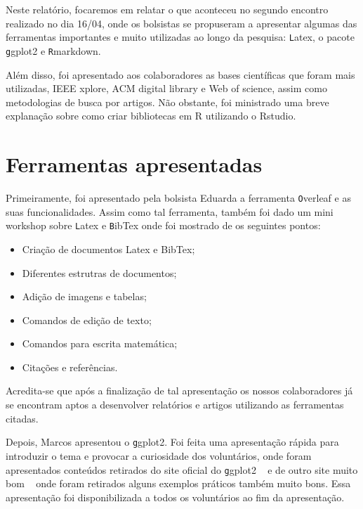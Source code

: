 \documentclass[12pt,letterpaper]{article}
\begin{document}
Neste relatório, focaremos em relatar o que aconteceu no segundo encontro realizado no dia 16/04, onde os bolsistas se propuseram a apresentar algumas das ferramentas importantes e muito utilizadas ao longo da pesquisa: \texttt Latex, o pacote \texttt ggplot2 e \texttt Rmarkdown. 

Além disso, foi apresentado aos colaboradores as bases científicas que foram mais utilizadas, IEEE xplore, ACM digital library e Web of science, assim como metodologias de busca por artigos. Não obstante, foi ministrado uma breve explanação sobre como criar bibliotecas em R utilizando o Rstudio.


\section{Ferramentas apresentadas}
 
Primeiramente, foi apresentado pela bolsista Eduarda a ferramenta \texttt Overleaf e as suas funcionalidades. Assim como tal ferramenta, também foi dado um mini workshop sobre \texttt Latex e \texttt BibTex onde foi mostrado de os seguintes pontos:

\begin{itemize}
\item Criação de documentos Latex e BibTex;
\item Diferentes estrutras de documentos;
\item Adição de imagens e tabelas;
\item Comandos de edição de texto;
\item Comandos para escrita matemática;
\item Citações e referências.
\end{itemize}

Acredita-se que após a finalização de tal apresentação os nossos colaboradores já se encontram aptos a desenvolver relatórios e artigos utilizando as ferramentas citadas.

Depois, Marcos apresentou o \texttt ggplot2. Foi feita uma apresentação rápida para introduzir o tema e provocar a curiosidade dos voluntários, onde foram apresentados conteúdos retirados do site oficial do \texttt ggplot2 ~\cite{ggplot}
e de outro site muito bom  ~\cite{ggplot2} onde foram retirados alguns exemplos práticos também muito bons. Essa apresentação foi disponibilizada a todos os voluntários ao fim da apresentação.
\end{document}

